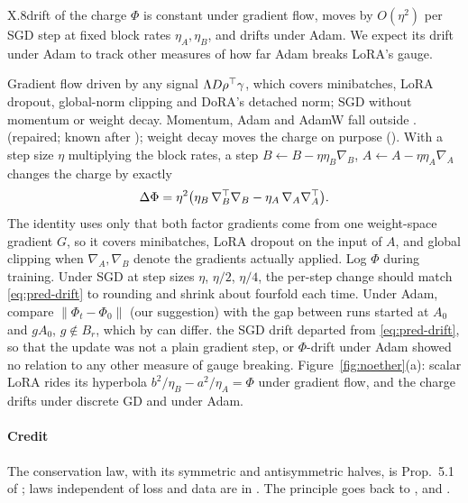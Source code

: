 \begin{prediction}{X.8}{drift of the charge}
$\Phi$ is constant under gradient flow, moves by $O(\eta^2)$ per SGD step at fixed block rates $\eta_A,\eta_B$, and
drifts under Adam. We expect its drift under Adam to track other measures of how far Adam breaks LoRA's gauge.
\begin{predmeta}
   Gradient flow driven by any signal $\Lambda D\rho\T\gamma$, which covers minibatches, LoRA dropout,
    global-norm clipping and DoRA's detached norm; SGD without momentum or weight decay. Momentum, Adam and AdamW fall
    outside .
    (repaired; known after \citealp{zhao2022symmetries}); weight decay moves
    the charge on purpose (). With a step size $\eta$ multiplying the block rates, a step
    $B\leftarrow B-\eta\eta_B\nabla_B$, $A\leftarrow A-\eta\eta_A\nabla_A$ changes the charge by exactly
    \begin{equation}\label{eq:pred-drift}
      \Delta\Phi=\eta^2\big(\eta_B\,\nabla_B\T\nabla_B-\eta_A\,\nabla_A\nabla_A\T\big).
    \end{equation}
    The identity uses only that both factor gradients come from one weight-space gradient $G$, so it covers
    minibatches, LoRA dropout on the input of $A$, and global clipping when $\nabla_A,\nabla_B$ denote the gradients
    actually applied.
   Log $\Phi$ during training. Under SGD at step sizes $\eta$, $\eta/2$, $\eta/4$, the per-step change
    should match \eqref{eq:pred-drift} to rounding and shrink about fourfold each time. Under Adam, compare
    $\lVert\Phi_t-\Phi_0\rVert$ (our suggestion) with the gap between runs started at $A_0$ and $gA_0$, $g\notin B_r$,
    which by  can differ.
   the SGD drift departed from \eqref{eq:pred-drift}, so that the update was not a plain
    gradient step, or $\Phi$-drift under Adam showed no relation to any other measure of gauge breaking.
   Figure~\ref{fig:noether}(a): scalar LoRA rides its hyperbola $b^2/\eta_B-a^2/\eta_A=\Phi$ under
    gradient flow, and the charge drifts under discrete GD and under Adam.
\end{predmeta}
\end{prediction}

\paragraph{Credit}
The conservation law, with its symmetric and antisymmetric halves, is Prop.~5.1 of \citet{zhao2022symmetries}; laws
independent of loss and data are in \citet{marcotte2023abide}. The principle goes back to \citet{du2018algorithmic},
\citet{arora2018optimization} and \citet{kunin2020neural}.

